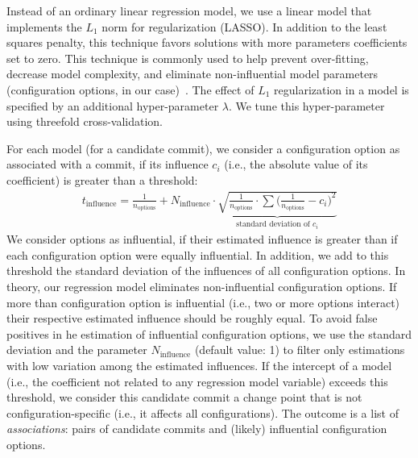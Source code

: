 \documentclass[sigconf]{acmart}
\begin{document}
	Instead of an ordinary linear regression model, we use a linear model that implements the $L_1$ norm for regularization (LASSO). In addition to the least squares penalty, this technique favors solutions with more parameters coefficients set to zero.
	This technique is commonly used to help prevent over-fitting, decrease model complexity, and eliminate non-influential model parameters (configuration options, in our case)~\cite{lasso}. The effect of $L_1$ regularization in a model is specified by an additional hyper-parameter $\lambda$. We tune this hyper-parameter using threefold cross-validation.
	
	For each model (for a candidate commit), we consider a configuration option as associated with a commit, if its influence $c_i$ (i.e., the absolute value of its coefficient) is greater than a threshold:%
	\begin{equation}
	\begin{gathered}
	t_\text{influence} = \frac{1}{n_\text{options}} + N_\text{influence} \cdot \underbrace{\sqrt{\frac{1}{n_\text{options}} \cdot \sum \Big(\frac{1}{n_\text{options}} - c_i\Big)^2}}_{\text{standard deviation of } c_i}
	\label{eq:t_influence}
	\end{gathered}
	\end{equation}
	We consider options as influential, if their estimated influence is greater than if each configuration option were equally influential. In addition, we add to this threshold the standard deviation of the influences of all configuration options. In theory, our regression model eliminates non-influential configuration options. If more than configuration option is influential (i.e., two or more options interact) their respective estimated influence should be roughly equal. To avoid false positives in he estimation of influential configuration options, we use the standard deviation and the parameter $N_\text{influence}$ (default value: 1) to filter only estimations with low variation among the estimated influences. If the intercept of a model (i.e., the coefficient not related to any regression model variable) exceeds this threshold, we consider this candidate commit a change point that is not configuration-specific (i.e., it affects all configurations). The outcome is a list of \emph{associations}: pairs of candidate commits and (likely) influential configuration options. 
	
\end{document}
